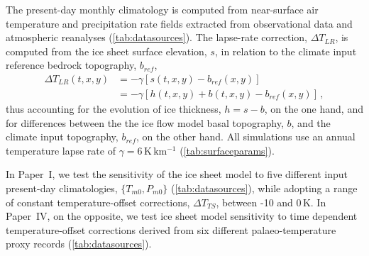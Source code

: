 \documentclass{article}
\newcommand{\unit}[1]{\ensuremath{\mathrm{#1}}}
\newcommand{\CCLI}[0]{Paper~I}      %
\newcommand{\CCYC}[0]{Paper~IV}     %
\begin{document}
The present-day monthly climatology is computed from
near-surface air temperature and precipitation rate fields extracted from
observational data and atmospheric reanalyses (\cref{tab:datasources}).
The lapse-rate correction, ${\Delta}T_{LR}$, is computed from the ice sheet
surface elevation, $s$, in relation to the
climate input reference bedrock topography, $b_{ref}$,
\begin{align}
    {\Delta}T_{LR}(t, x, y) &= -\gamma [s(t, x, y)-b_{ref}(x, y)] \\
                            &= -\gamma [h(t, x, y)+b(t, x, y)-b_{ref}(x, y)]\,,
\end{align}
thus accounting for the evolution of ice thickness, ${h=s-b}$, on the one hand,
and
for differences between the the ice flow model basal topography, $b$, and the
climate input topography, $b_{ref}$, on the other hand. All simulations use an
annual temperature lapse rate of $\gamma = 6\,\unit{K\,km^{-1}}$
(\cref{tab:surfaceparams}).

In \CCLI, we test the sensitivity of the ice sheet model to five different
input present-day climatologies, $\{T_{m0}, P_{m0}\}$ (\cref{tab:datasources}),
while adopting a range of constant temperature-offset corrections,
${\Delta}T_{TS}$, between -10 and 0\,K. In \CCYC, on the opposite, we test ice
sheet model sensitivity to time dependent temperature-offset corrections
derived from six different palaeo-temperature proxy records
(\cref{tab:datasources}).
\end{document}
